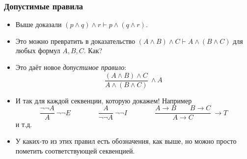 \documentclass[10pt]{beamer}
\begin{document}
\begin{frame}
    \frametitle{Допустимые правила}
    \begin{itemize}
        \item Выше доказали $(p \land q) \land r \vdash p \land (q \land r)$.
        \item Это можно превратить в доказательство $(A \land B) \land C \vdash A \land (B \land C)$ для любых формул $A,B,C$. Как? \pause
        \item Это даёт новое \emph{допустимое правило}:
        \[
            \frac{(A \land B) \land C}{A \land (B \land C)}\ \wedge A
        \]
        \item И так для каждой секвенции, которую докажем! Например
        \[
            \frac{\neg \neg A}{A}\ \neg \neg E \qquad \qquad \frac{A}{\neg \neg A}\ \neg \neg I \qquad \qquad \frac{A \to B \qquad B \to C}{A \to C}\ \to T
        \]
        и т.д.
        \item У каких-то из этих правил есть обозначения, как выше, но можно просто пометить соответствующей секвенцией.
    \end{itemize}
\end{frame}
\end{document}

